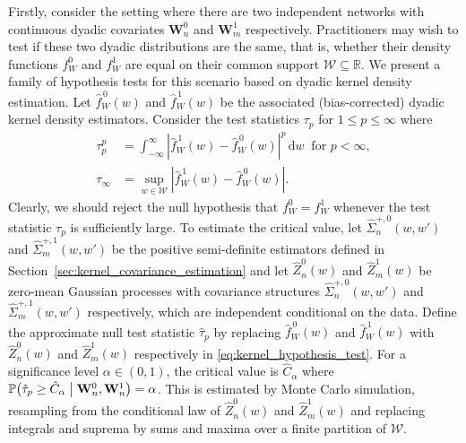 \documentclass[11pt,lof]{puthesis}
\renewcommand{\P}{\ensuremath{\mathbb{P}}}
\newcommand{\R}{\ensuremath{\mathbb{R}}}
\newcommand{\bW}{\ensuremath{\mathbf{W}}}
\newcommand{\cW}{\ensuremath{\mathcal{W}}}
\newcommand{\diff}[1]{\,\mathrm{d}#1}
\theoremstyle{break}
\theoremstyle{proof}
\begin{document}
Firstly, consider the setting where there are two independent networks with
continuous dyadic covariates $\bW_n^0$ and $\bW_m^1$ respectively.
Practitioners may wish to test if these two dyadic distributions are the same,
that is, whether their density functions $f_W^0$ and $f_W^1$ are equal on their
common support $\cW \subseteq \R$. We present a family of hypothesis tests for
this scenario based on dyadic kernel density estimation. Let $\hat
f_W^{\,0}(w)$ and $\hat f_W^{\,1}(w)$ be the associated (bias-corrected) dyadic
kernel density estimators. Consider the test statistics $\tau_p$ for
$1 \leq p \leq \infty$ where
%
\begin{align}
\nonumber
\tau_p^p
&= \int_{-\infty}^{\infty}
\left| \hat f_W^{\,1}(w) - \hat f_W^{\,0}(w) \right|^p
\diff w
\ \text{ for } p < \infty, \\
\label{eq:kernel_hypothesis_test}
\tau_\infty
&= \sup_{w \in \cW} \left| \hat f_W^{\,1}(w) - \hat f_W^{\,0}(w) \right|.
\end{align}
%
Clearly, we should reject the null hypothesis that $f_W^0 = f_W^1$ whenever the
test statistic $\tau_p$ is sufficiently large. To estimate the critical value,
let $\hat\Sigma_n^{+,0}(w, w')$ and $\hat\Sigma_m^{+,1}(w, w')$ be the positive
semi-definite estimators defined in
Section~\ref{sec:kernel_covariance_estimation} and
let $\hat Z^0_n(w)$ and $\hat Z^1_m(w)$ be zero-mean Gaussian processes with
covariance structures $\hat\Sigma_n^{+,0}(w, w')$ and
$\hat\Sigma_m^{+,1}(w, w')$ respectively, which are independent conditional on
the data. Define the approximate null test statistic $\hat \tau_p$ by replacing
$\hat f_W^{\,0}(w)$ and $\hat f_W^{\,1}(w)$ with $\hat Z^0_n(w)$ and
$\hat Z^1_m(w)$ respectively in \eqref{eq:kernel_hypothesis_test}.
For a significance level
$\alpha \in (0,1)$, the critical value is $\hat C_\alpha$ where
%
$\P \big(
\hat \tau_p \geq \hat C_\alpha \bigm\vert \bW_n^0, \bW_n^1
\big) = \alpha$.
%
This is estimated by Monte Carlo simulation, resampling from the conditional
law of $\hat Z^0_n(w)$ and $\hat Z^1_m(w)$ and replacing integrals and suprema
by sums and maxima over a finite partition of $\cW$.
\end{document}
